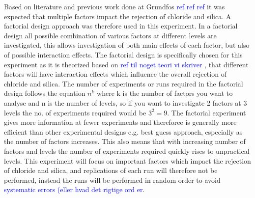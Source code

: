 Based on literature and previous work done at Grundfos \textcolor{blue}{ref ref ref } it was expected that multiple factors impact the rejection of chloride and silica. 
A factorial design approach was therefore used in this experiment.  
In a factorial design all possible combination of various factors at different levels are investigated, this allows investigation of both main effects of each factor, but also of possible interaction effects.  \citep{DesignOfExperiments_book_bruno}
The factorial design is specifically chosen for this experiment as it is theorized based on \textcolor{blue}{ref til noget teori vi skriver }, that different factors will have interaction effects which influence the overall rejection of chloride and silica. 
The number of experiments or runs required in the factorial design  follows the equation  $n^k$ where k is the number of factors you want to analyse and n is the number of levels, so if you want to investigate 2 factors at 3 levels the no. of experiments required would be $3^2=9$.
The factorial experiment gives more information at fewer experiments and thereforee is generally more efficient than other experimental designs e.g. best guess approach, especially as the number of factors increases.
This also means that with increasing number of factors and levels the number of experiments required quickly rises to unpractical levels. \citep{DesignOfExperiments_book_bruno} 
This experiment will focus on important factors which impact the rejection of chloride and silica, and replications of each run will therefore not be performed, instead the runs will be performed in random order to avoid \textcolor{blue}{systematic errors (eller hvad det rigtige ord er}. 


